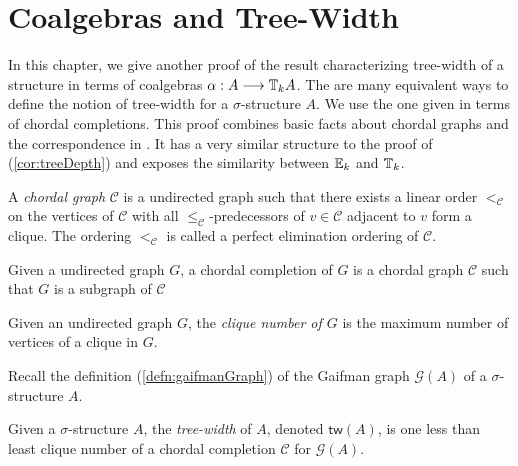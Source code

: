\section{Coalgebras and Tree-Width}
In this chapter, we give another proof of the result \cite[Theorem 23]{Abramsky2017} characterizing tree-width of a structure in terms of coalgebras $\alpha:A \longrightarrow {\mathbb{T}_{k}A}$. The are many equivalent ways to define the notion of tree-width for a $\sigma$-structure $A$. We use the one given \cite{Parra1997} in terms of chordal completions. This proof combines basic facts about chordal graphs and the correspondence in \cite[Theorem 6]{Abramsky2017}. It has a very similar structure to the proof of (\ref{cor:treeDepth}) and exposes the similarity between ${\mathbb{E}_{k}}$ and ${\mathbb{T}_{k}}$.  
\begin{defn}
A \textit{chordal graph} $\mathcal{C}$ is a undirected graph such that there exists a linear order $<_{\mathcal{C}}$ on the vertices of $\mathcal{C}$ with all $\leq_{\mathcal{C}}$-predecessors of $v \in \mathcal{C}$ adjacent to $v$ form a clique. The ordering $<_{\mathcal{C}}$ is called a perfect elimination ordering of $\mathcal{C}$.   
\label{defn:chordalGraph}
\end{defn}
\begin{defn}
Given a undirected graph $G$, a chordal completion of $G$ is a chordal graph $\mathcal{C}$ such that $G$ is a subgraph of $\mathcal{C}$ 
\end{defn}
\begin{defn}
Given an undirected graph $G$, the \textit{clique number of $G$} is the maximum number of vertices of a clique in $G$.
\end{defn}
Recall the definition (\ref{defn:gaifmanGraph}) of the Gaifman graph $\mathcal{G}(A)$ of a $\sigma$-structure $A$.
\begin{defn}
Given a $\sigma$-structure $A$, the \textit{tree-width} of $A$, denoted $\mathsf{tw}(A)$, is one less than least clique number of a chordal completion $\mathcal{C}$ for $\mathcal{G}(A)$. 
\label{defn:treeWidth}
\end{defn}
